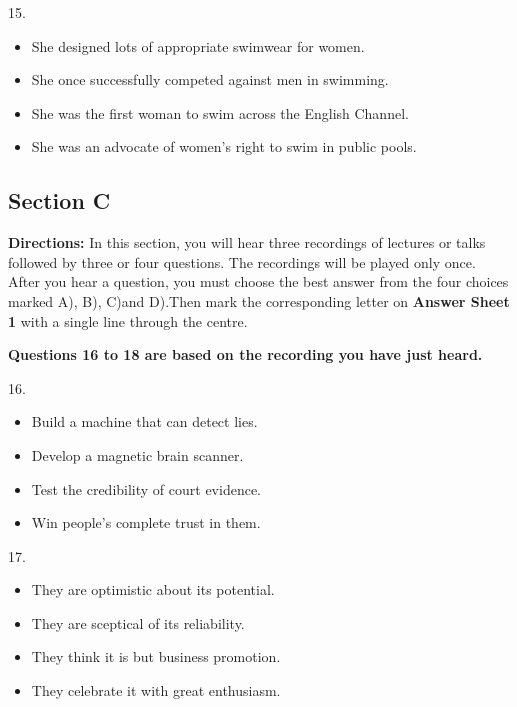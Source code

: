 \documentclass[UTF8,11pt]{ctexart}
\begin{document}
15.


\begin{itemize}[leftmargin=2em,itemsep=.2em,topsep=.4em]\item[A.] She designed lots of appropriate swimwear for women.
\item[B.] She once successfully competed against men in swimming.
\item[C.] She was the first woman to swim across the English Channel.
\item[D.] She was an advocate of women’s right to swim in public pools.
\end{itemize}

\subsection*{\textbf{Section C}}


\textbf{Directions:} In this section, you will hear three recordings of lectures or talks followed by three or four questions. The recordings will be played only once. After you hear a question, you must choose the best answer from the four choices marked A), B), C)and D).Then mark the corresponding letter on\textbf{ Answer Sheet 1} with a single line through the centre.


\textbf{Questions 16 to 18 are based on the recording you have just heard.}


16.


\begin{itemize}[leftmargin=2em,itemsep=.2em,topsep=.4em]\item[A.] Build a machine that can detect lies.
\item[B.] Develop a magnetic brain scanner.
\item[C.] Test the credibility of court evidence.
\item[D.] Win people’s complete trust in them.
\end{itemize}

17.


\begin{itemize}[leftmargin=2em,itemsep=.2em,topsep=.4em]\item[A.] They are optimistic about its potential.
\item[B.] They are sceptical of its reliability.
\item[C.] They think it is but business promotion.
\item[D.] They celebrate it with great enthusiasm.
\end{itemize}
\end{document}
